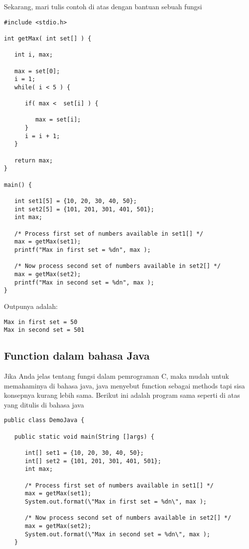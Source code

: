 Sekarang, mari tulis contoh di atas dengan bantuan sebuah fungsi
\begin {verbatim}
#include <stdio.h>
 
int getMax( int set[] ) {
 
   int i, max;
    
   max = set[0];
   i = 1;    
   while( i < 5 ) {
   
      if( max <  set[i] ) {
     
         max = set[i];
      }
      i = i + 1;
   }
     
   return max;
}
 
main() {
 
   int set1[5] = {10, 20, 30, 40, 50};
   int set2[5] = {101, 201, 301, 401, 501};
   int max;
 
   /* Process first set of numbers available in set1[] */
   max = getMax(set1);
   printf("Max in first set = %
     
   /* Now process second set of numbers available in set2[] */
   max = getMax(set2);
   printf("Max in second set = %
}
\end {verbatim}
Outpunya adalah: 
\begin {verbatim}
Max in first set = 50
Max in second set = 501
\end {verbatim}

\subsection {Function dalam bahasa Java}
Jika Anda jelas tentang fungsi dalam pemrograman C, maka mudah untuk memahaminya di bahasa java, java menyebut function sebagai methods tapi sisa konsepnya kurang lebih sama. 
Berikut ini adalah program sama seperti di atas yang ditulis di bahasa java 
\begin {verbatim}
public class DemoJava {
     
   public static void main(String []args) {
  
      int[] set1 = {10, 20, 30, 40, 50};
      int[] set2 = {101, 201, 301, 401, 501};
      int max;
 
      /* Process first set of numbers available in set1[] */
      max = getMax(set1);
      System.out.format(\"Max in first set = %
 
      /* Now process second set of numbers available in set2[] */
      max = getMax(set2);
      System.out.format(\"Max in second set = %
   }
    

\end{verbatim}
